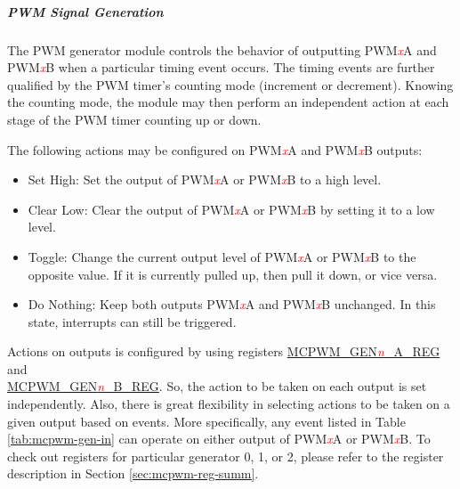 \documentclass[main\_\_EN.tex]{subfiles}
\begin{document}
\subparagraph{PWM Signal Generation}
\label{subpara:mcpwm-op-gen}
The PWM generator module controls the behavior of outputting PWM\textcolor{red}{\it{x}}A and PWM\textcolor{red}{\it{x}}B when a particular timing event occurs. The timing events are further qualified by the PWM timer's counting mode (increment or decrement). Knowing the counting mode, the module may then perform an independent action at each stage of the PWM timer counting up or down.

The following actions may be configured on PWM\textcolor{red}{\it{x}}A and PWM\textcolor{red}{\it{x}}B outputs:
\begin{itemize}
    \item Set High: Set the output of PWM\textcolor{red}{\it{x}}A or PWM\textcolor{red}{\it{x}}B to a high level.
    \item Clear Low: Clear the output of PWM\textcolor{red}{\it{x}}A or PWM\textcolor{red}{\it{x}}B by setting it to a low level.
    \item Toggle: Change the current output level of PWM\textcolor{red}{\it{x}}A or PWM\textcolor{red}{\it{x}}B to the opposite value. If it is currently pulled up, then pull it down, or vice versa.
    \item Do Nothing: Keep both outputs PWM\textcolor{red}{\it{x}}A and PWM\textcolor{red}{\it{x}}B unchanged. In this state, interrupts can still be triggered.
\end{itemize}

Actions on outputs is configured by using registers \hyperref[regdesc:MCPWMGENNAREG]{MCPWM\_GEN\textcolor{red}{\it{n}}\_A\_REG} and \\\hyperref[regdesc:MCPWMGENNBREG]{MCPWM\_GEN\textcolor{red}{\it{n}}\_B\_REG}. So, the action to be taken on each output is set independently. Also, there is great flexibility in selecting actions to be taken on a given output based on events. More specifically, any event listed in Table \ref{tab:mcpwm-gen-in} can operate on either output of PWM\textcolor{red}{\it{x}}A or PWM\textcolor{red}{\it{x}}B. To check out registers for particular generator 0, 1, or 2, please refer to the register description in Section \ref{sec:mcpwm-reg-summ}.
\end{document}
